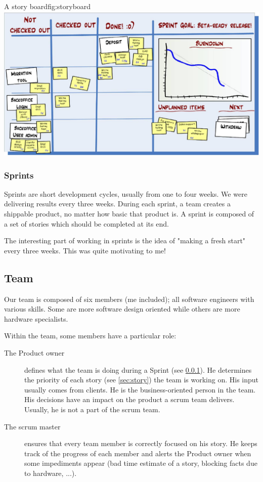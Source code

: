 \begin{figureGraphics}{A story board}{fig:storyboard}
    \includegraphics[width=\textwidth]{./src/img/taskboard.jpg}
\end{figureGraphics}


\subsubsection{Sprints}\label{sec:sprint}
Sprints are short development cycles, usually from one to four weeks. We were
delivering results every three weeks. During each sprint, a team creates a
shippable product, no matter how basic that product is. A sprint is composed of
a set of stories which should be completed at its end.

The interesting part of working in sprints is the idea of "making a fresh start" every three weeks. This
was quite motivating to me!


\subsection{Team}
Our team is composed of six members (me included); all software engineers with various
skills. Some are more software design oriented while others are more hardware
specialists.

Within the team, some members have a particular role:
\begin{description}
    \item[The Product owner]
        defines what the team is doing during a Sprint (see \ref{sec:sprint}).
        He determines the priority of each story (see \ref{sec:story}) the
        team is working on. His input usually comes from clients. He is the
        business-oriented person in the team. His decisions have an impact on
        the product a \gls{scrum} team delivers. Usually, he is not
        a part of the \gls{scrum} team.
    \item[The scrum master]
        ensures that every team member is correctly focused on his story. He
        keeps track of the progress of each member and alerts the
        Product owner when some impediments appear (bad time estimate of a
        story, blocking facts due to hardware, ...).
\end{description}

